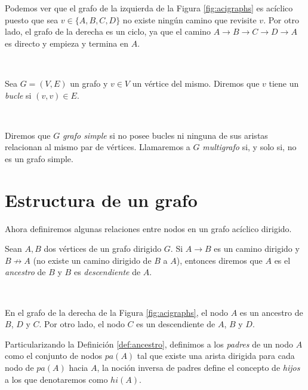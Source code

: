 \documentclass[oneside,openright,titlepage,numbers=noenddot,openany,headinclude,footinclude=true,
cleardoublepage=empty,abstractoff,BCOR=5mm,paper=a4,fontsize=12pt,main=spanish]{scrreprt}
\begin{document}
\begin{example}
Podemos ver que el grafo de la izquierda de la Figura \ref{fig:acigraphs} es acíclico puesto que sea $v\in \{A,B,C,D\}$ no existe ningún camino que revisite $v$. Por otro lado, el grafo de la derecha es un ciclo, ya que el camino $A\to B \to C \to D \to A$ es directo y empieza y termina en $A$.
\end{example}\

\begin{definition}[Bucle]
Sea $G=(V,E)$ un grafo y $v\in V$ un vértice del mismo. Diremos que $v$ tiene un \textit{bucle} si $(v,v)\in E$.
\end{definition}\

\begin{definition}
Diremos que $G$ \textit{grafo simple} si no posee bucles ni ninguna de sus aristas relacionan al mismo par de vértices. Llamaremos a $G$ \textit{multigrafo} si, y solo si, no es un grafo simple.
\end{definition}

\section{Estructura de un grafo}

Ahora definiremos algunas relaciones entre nodos en un grafo acíclico dirigido.\\

\begin{definition} \label{def:ancestro}
Sean $A,B$ dos vértices de un grafo dirigido $G$. Si $A \to B$ es un camino dirigido y $B \not \to A$ (no existe un camino dirigido de $B$ a $A$), entonces diremos que $A$ es el \textit{ancestro} de $B$ y $B$ es \textit{descendiente} de $A$.
\end{definition}\

\begin{example}
En el grafo de la derecha de la Figura \ref{fig:acigraphs}, el nodo $A$ es un ancestro de  $B$, $D$ y $C$. Por otro lado, el nodo $C$ es un descendiente de $A$, $B$ y $D$.
\end{example}

\clearpage

\begin{definition}
Particularizando la Definición \ref{def:ancestro}, definimos a los \textit{padres} de un nodo $A$ como el conjunto de nodos $pa(A)$ tal que existe una arista dirigida para cada nodo de $pa(A)$ hacia $A$, la noción inversa de padres define el concepto de \textit{hijos} a los que denotaremos como $hi(A)$.
\end{definition}\
\end{document}
